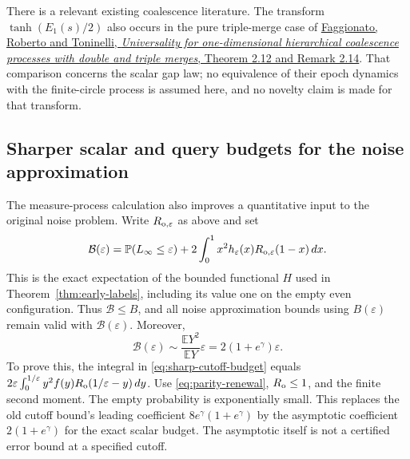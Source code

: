\documentclass[11pt,letterpaper]{article}
\newcommand{\PP}{\mathbb P}\newcommand{\EE}{\mathbb E}
\begin{document}
There is a relevant existing coalescence literature. The transform
$\tanh(E_1(s)/2)$ also occurs in the pure triple-merge case of
\href{https://arxiv.org/abs/1112.4630}{Faggionato, Roberto and Toninelli,
\emph{Universality for one-dimensional hierarchical coalescence processes
with double and triple merges}, Theorem 2.12 and Remark 2.14}.
That comparison concerns the scalar gap law; no equivalence of their
epoch dynamics with the finite-circle process is assumed here, and no
novelty claim is made for that transform.

\subsection{Sharper scalar and query budgets for the noise approximation}
\label{sec:sharper-budgets}

The measure-process calculation also improves a quantitative input to
the original noise problem. Write $R_{{\rm o},\varepsilon}$ as above and set
\begin{equation}\label{eq:sharp-cutoff-budget}
 \mathcal B(\varepsilon)=\PP(L_\infty\le\varepsilon)
  +2\int_0^1x^2h_\varepsilon(x)
                       R_{{\rm o},\varepsilon}(1-x)\,dx.
\end{equation}
This is the exact expectation of the bounded functional $H$ used in
Theorem~\ref{thm:early-labels}, including its value one on the empty
even configuration. Thus $\mathcal B\le B$, and all noise approximation
bounds using $B(\varepsilon)$ remain valid with $\mathcal B(\varepsilon)$.
Moreover,
\begin{equation}\label{eq:sharp-cutoff-asymptotic}
 \mathcal B(\varepsilon)\sim
 \frac{\EE Y^2}{\EE Y}\varepsilon
 =2(1+e^\gamma)\varepsilon.
\end{equation}
To prove this, the integral in \eqref{eq:sharp-cutoff-budget} equals
$2\varepsilon\int_0^{1/\varepsilon}y^2 f(y)
R_{\rm o}(1/\varepsilon-y)\,dy$.
Use \eqref{eq:parity-renewal}, $R_{\rm o}\le1$, and the finite second
moment. The empty probability is exponentially small. This replaces
the old cutoff bound's leading coefficient $8e^\gamma(1+e^\gamma)$ by
the asymptotic coefficient $2(1+e^\gamma)$ for the exact scalar budget.
The asymptotic itself is not a certified error bound at a specified cutoff.
\end{document}

